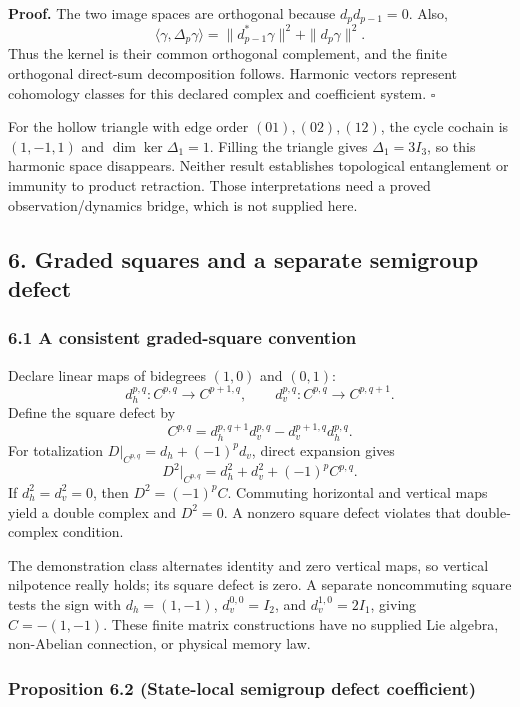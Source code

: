 \documentclass[
  11pt,
]{article}
\begin{document}
\textbf{Proof.} The two image spaces are orthogonal because
\(d_pd_{p-1}=0\). Also,
\[
\langle\gamma,\Delta_p\gamma\rangle
 =\|d_{p-1}^*\gamma\|^2+\|d_p\gamma\|^2.
\]
Thus the kernel is their common orthogonal complement, and the finite
orthogonal direct-sum decomposition follows. Harmonic vectors represent
cohomology classes for this declared complex and coefficient system. \(\square\)

For the hollow triangle with edge order
\((01),(02),(12)\), the cycle cochain is \((1,-1,1)\) and
\(\dim\ker\Delta_1=1\). Filling the triangle gives
\(\Delta_1=3I_3\), so this harmonic space disappears.
Neither result establishes topological entanglement or immunity to product
retraction. Those interpretations need a proved observation/dynamics bridge,
which is not supplied here.

\subsection{6. Graded squares and a separate semigroup defect}\label{graded-squares-and-a-separate-semigroup-defect}

\subsubsection{6.1 A consistent graded-square convention}\label{a-consistent-graded-square-convention}

Declare linear maps of bidegrees \((1,0)\) and \((0,1)\):
\[
d_h^{p,q}:C^{p,q}\to C^{p+1,q},\qquad
d_v^{p,q}:C^{p,q}\to C^{p,q+1}.
\]
Define the square defect by
\[
C^{p,q}=
d_h^{p,q+1}d_v^{p,q}
-d_v^{p+1,q}d_h^{p,q}.
\]
For totalization \(D|_{C^{p,q}}=d_h+(-1)^p d_v\), direct expansion gives
\[
D^2|_{C^{p,q}}
=d_h^2+d_v^2+(-1)^p C^{p,q}.
\]
If \(d_h^2=d_v^2=0\), then \(D^2=(-1)^p C\).
Commuting horizontal and vertical maps yield a double complex and \(D^2=0\).
A nonzero square defect violates that double-complex condition.

The demonstration class alternates identity and zero vertical maps, so
vertical nilpotence really holds; its square defect is zero.
A separate noncommuting square tests the sign with
\(d_h=(1,-1)\), \(d_v^{0,0}=I_2\), and \(d_v^{1,0}=2I_1\), giving
\(C=-(1,-1)\).
These finite matrix constructions have no supplied Lie algebra, non-Abelian
connection, or physical memory law.

\subsubsection{Proposition 6.2 (State-local semigroup defect coefficient)}\label{proposition-6.2-state-local-semigroup-defect-coefficient}
\end{document}
